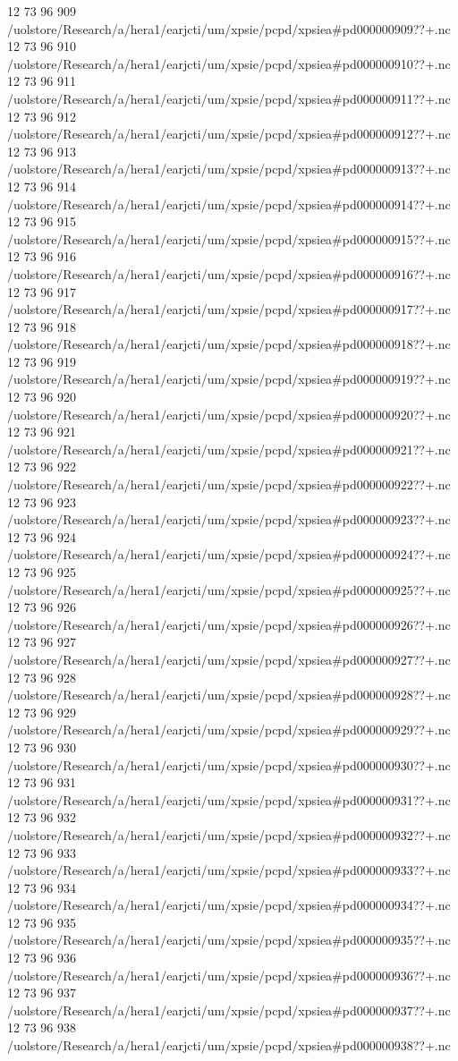 12 73 96
909
/uolstore/Research/a/hera1/earjcti/um/xpsie/pcpd/xpsiea#pd000000909??+.nc
12 73 96
910
/uolstore/Research/a/hera1/earjcti/um/xpsie/pcpd/xpsiea#pd000000910??+.nc
12 73 96
911
/uolstore/Research/a/hera1/earjcti/um/xpsie/pcpd/xpsiea#pd000000911??+.nc
12 73 96
912
/uolstore/Research/a/hera1/earjcti/um/xpsie/pcpd/xpsiea#pd000000912??+.nc
12 73 96
913
/uolstore/Research/a/hera1/earjcti/um/xpsie/pcpd/xpsiea#pd000000913??+.nc
12 73 96
914
/uolstore/Research/a/hera1/earjcti/um/xpsie/pcpd/xpsiea#pd000000914??+.nc
12 73 96
915
/uolstore/Research/a/hera1/earjcti/um/xpsie/pcpd/xpsiea#pd000000915??+.nc
12 73 96
916
/uolstore/Research/a/hera1/earjcti/um/xpsie/pcpd/xpsiea#pd000000916??+.nc
12 73 96
917
/uolstore/Research/a/hera1/earjcti/um/xpsie/pcpd/xpsiea#pd000000917??+.nc
12 73 96
918
/uolstore/Research/a/hera1/earjcti/um/xpsie/pcpd/xpsiea#pd000000918??+.nc
12 73 96
919
/uolstore/Research/a/hera1/earjcti/um/xpsie/pcpd/xpsiea#pd000000919??+.nc
12 73 96
920
/uolstore/Research/a/hera1/earjcti/um/xpsie/pcpd/xpsiea#pd000000920??+.nc
12 73 96
921
/uolstore/Research/a/hera1/earjcti/um/xpsie/pcpd/xpsiea#pd000000921??+.nc
12 73 96
922
/uolstore/Research/a/hera1/earjcti/um/xpsie/pcpd/xpsiea#pd000000922??+.nc
12 73 96
923
/uolstore/Research/a/hera1/earjcti/um/xpsie/pcpd/xpsiea#pd000000923??+.nc
12 73 96
924
/uolstore/Research/a/hera1/earjcti/um/xpsie/pcpd/xpsiea#pd000000924??+.nc
12 73 96
925
/uolstore/Research/a/hera1/earjcti/um/xpsie/pcpd/xpsiea#pd000000925??+.nc
12 73 96
926
/uolstore/Research/a/hera1/earjcti/um/xpsie/pcpd/xpsiea#pd000000926??+.nc
12 73 96
927
/uolstore/Research/a/hera1/earjcti/um/xpsie/pcpd/xpsiea#pd000000927??+.nc
12 73 96
928
/uolstore/Research/a/hera1/earjcti/um/xpsie/pcpd/xpsiea#pd000000928??+.nc
12 73 96
929
/uolstore/Research/a/hera1/earjcti/um/xpsie/pcpd/xpsiea#pd000000929??+.nc
12 73 96
930
/uolstore/Research/a/hera1/earjcti/um/xpsie/pcpd/xpsiea#pd000000930??+.nc
12 73 96
931
/uolstore/Research/a/hera1/earjcti/um/xpsie/pcpd/xpsiea#pd000000931??+.nc
12 73 96
932
/uolstore/Research/a/hera1/earjcti/um/xpsie/pcpd/xpsiea#pd000000932??+.nc
12 73 96
933
/uolstore/Research/a/hera1/earjcti/um/xpsie/pcpd/xpsiea#pd000000933??+.nc
12 73 96
934
/uolstore/Research/a/hera1/earjcti/um/xpsie/pcpd/xpsiea#pd000000934??+.nc
12 73 96
935
/uolstore/Research/a/hera1/earjcti/um/xpsie/pcpd/xpsiea#pd000000935??+.nc
12 73 96
936
/uolstore/Research/a/hera1/earjcti/um/xpsie/pcpd/xpsiea#pd000000936??+.nc
12 73 96
937
/uolstore/Research/a/hera1/earjcti/um/xpsie/pcpd/xpsiea#pd000000937??+.nc
12 73 96
938
/uolstore/Research/a/hera1/earjcti/um/xpsie/pcpd/xpsiea#pd000000938??+.nc
